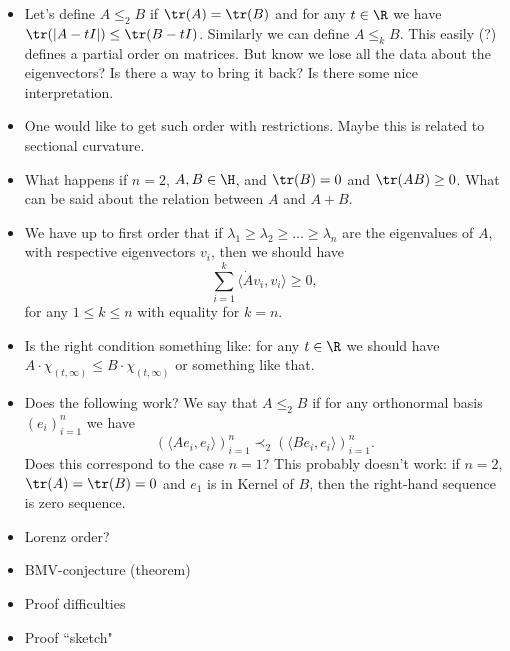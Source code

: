 \begin{itemize}
	\item Let's define $A \leq_{2} B$ if $\tr(A) = \tr(B)$ and for any $t \in \R$ we have $\tr(|A - t I|) \leq \tr(B - t I)$. Similarly we can define $A \leq_{k} B$. This easily (?) defines a partial order on matrices. But know we lose all the data about the eigenvectors? Is there a way to bring it back? Is there some nice interpretation.
	\item One would like to get such order with restrictions. Maybe this is related to sectional curvature.
	\item What happens if $n = 2$, $A, B \in \H$, and $\tr(B) = 0$ and $\tr(AB) \geq 0$. What can be said about the relation between $A$ and $A + B$.
	\item We have up to first order that if $\lambda_{1} \geq \lambda_{2} \geq \ldots \geq \lambda_{n}$ are the eigenvalues of $A$, with respective eigenvectors $v_{i}$, then we should have
	\[
		\sum_{i = 1}^{k} \langle \dot{A} v_{i}, v_{i}\rangle \geq 0,
	\]
	for any $1 \leq k \leq n$ with equality for $k = n$.
	\item Is the right condition something like: for any $t \in \R$ we should have $A \cdot \chi_{(t, \infty)} \leq B \cdot \chi_{(t, \infty)}$ or something like that.
	\item Does the following work? We say that $A \leq_{2} B$ if for any orthonormal basis $(e_{i})_{i = 1}^{n}$ we have
	\[
		(\langle A e_{i}, e_{i} \rangle)_{i = 1}^{n} \prec_{2} (\langle B e_{i}, e_{i} \rangle)_{i = 1}^{n}.
	\]
	Does this correspond to the case $n = 1$? This probably doesn't work: if $n = 2$, $\tr(A) = \tr(B) = 0$ and $e_{1}$ is in Kernel of $B$, then the right-hand sequence is zero sequence.
	\item Lorenz order?
	\item BMV-conjecture (theorem)
	\item Proof difficulties
	\item Proof ``sketch"
\end{itemize}

